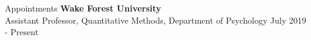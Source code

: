 \begin{rSection}{\textrm{Appointments}}
{\bf Wake Forest University}\\
Assistant Professor, Quantitative Methods, Department of Psychology \hfill{July 2019 - Present}
\end{rSection}

